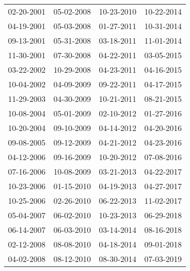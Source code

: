 \begin{supertabular}{llll}
 02-20-2001 &  05-02-2008 &  10-23-2010 &  10-22-2014 \\
 04-19-2001 &  05-03-2008 &  01-27-2011 &  10-31-2014 \\
 09-13-2001 &  05-31-2008 &  03-18-2011 &  11-01-2014 \\
 11-30-2001 &  07-30-2008 &  04-22-2011 &  03-05-2015 \\
 03-22-2002 &  10-29-2008 &  04-23-2011 &  04-16-2015 \\
 10-04-2002 &  04-09-2009 &  09-22-2011 &  04-17-2015 \\
 11-29-2003 &  04-30-2009 &  10-21-2011 &  08-21-2015 \\
 10-08-2004 &  05-01-2009 &  02-10-2012 &  01-27-2016 \\
 10-20-2004 &  09-10-2009 &  04-14-2012 &  04-20-2016 \\
 09-08-2005 &  09-12-2009 &  04-21-2012 &  04-23-2016 \\
 04-12-2006 &  09-16-2009 &  10-20-2012 &  07-08-2016 \\
 07-16-2006 &  10-08-2009 &  03-21-2013 &  04-22-2017 \\
 10-23-2006 &  01-15-2010 &  04-19-2013 &  04-27-2017 \\
 10-25-2006 &  02-26-2010 &  06-22-2013 &  11-02-2017 \\
 05-04-2007 &  06-02-2010 &  10-23-2013 &  06-29-2018 \\
 06-14-2007 &  06-03-2010 &  03-14-2014 &  08-16-2018 \\
 02-12-2008 &  08-08-2010 &  04-18-2014 &  09-01-2018 \\
 04-02-2008 &  08-12-2010 &  08-30-2014 &  07-03-2019 \\
\end{supertabular}
